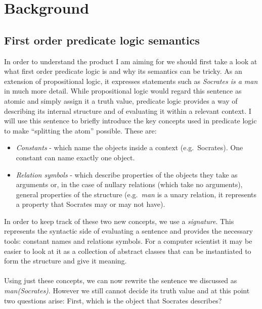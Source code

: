 \documentclass{report}
\begin{document}

\chapter{Background}

\section{First order predicate logic semantics}
In order to understand the product I am aiming for we should first take a look 
at what first order predicate logic is and why its semantics can be tricky. As 
an extension of propositional logic, it expresses statements such as 
\emph{Socrates is a man} in much more detail.
While propositional logic would regard this sentence as atomic and simply assign
it a truth value, predicate logic provides a way of describing its internal
structure and of evaluating it within a relevant context. I will use this
sentence to briefly introduce the key concepts used in predicate logic to make
``splitting the atom'' possible. These are:
  \begin{itemize}
	\item \emph{Constants} 
  - which name the objects inside a context (e.g.\ Socrates). One constant can 
  name exactly one object.
	\item \emph{Relation symbols}
  - which describe properties of the objects they take as arguments or, in the
  case of nullary relations (which take no arguments), general properties of
  the structure (e.g.\ \emph{man} is a unary relation, it represents a property
  that Socrates may or may not have).
  \end{itemize}
In order to keep track of these two new concepts, we use a \emph{signature}.
This represents the syntactic side of evaluating a sentence and provides the
necessary tools: constant names and relations symbols. For a computer scientist 
it may be easier to look at it as a collection of abstract classes that can be 
instantiated to form the structure and give it meaning. \\ \\
Using just these concepts, we can now rewrite the sentence we discussed as 
\emph{man(Socrates)}. However we still cannot decide its truth value and at this
point two questions arise: 
First, which is the object that Socrates describes?
\end{document}
